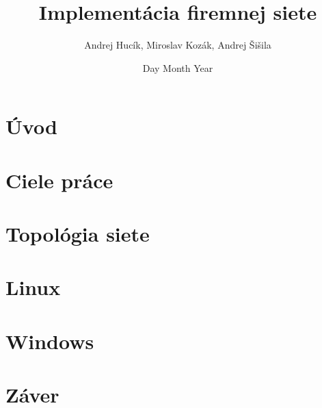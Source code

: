 \documentclass[12pt,twoside]{report}
\title{Implementácia firemnej siete}
\author{Andrej Hucík, Miroslav Kozák, Andrej Šišila}
\date{Day Month Year}
\begin{document}


%

\tableofcontents

\listoffigures

\listoftables

\chapter{Úvod}


\chapter{Ciele práce}


\chapter{Topológia siete}


\chapter{Linux}


\chapter{Windows}


\chapter{Záver}


\printbibliography
\end{document}
